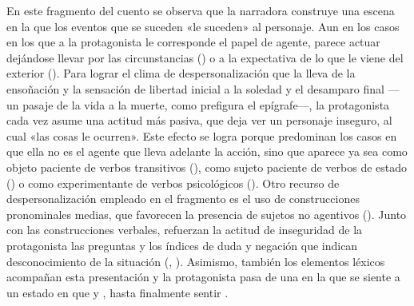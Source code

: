 \begin{recuadro}
En este fragmento del cuento se observa que la narradora construye una escena en
la que los eventos que se suceden «le suceden» al personaje. Aun en los casos en
los que a la protagonista le corresponde el papel de agente, parece actuar
dejándose llevar por las circunstancias () o a la expectativa de lo que le viene del exterior (). Para lograr el clima de despersonalización que la lleva de la
ensoñación y la sensación de libertad inicial a la soledad y el desamparo final
---un pasaje de la vida a la muerte, como prefigura el epígrafe---, la
protagonista cada vez asume una actitud más pasiva, que deja ver un personaje
inseguro, al cual «las cosas le ocurren». Este efecto se logra porque predominan
los casos en que ella no es el agente que lleva adelante la acción, sino que
aparece ya sea como objeto paciente de verbos transitivos (), como sujeto
paciente de verbos de estado () o como experimentante de verbos psicológicos (). Otro recurso de
despersonalización empleado en el fragmento es el uso de construcciones
pronominales medias, que favorecen la presencia de sujetos no agentivos
(). Junto con
las construcciones verbales, refuerzan la actitud de inseguridad de la
protagonista las preguntas y los índices de duda y negación que indican
desconocimiento de la situación (, ).
Asimismo, también los elementos léxicos acompañan esta presentación y la
protagonista pasa de una  en la que se siente  a
un estado en que  y , hasta finalmente sentir .
\end{recuadro}

